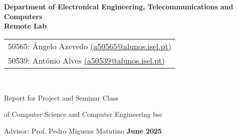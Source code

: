 \documentclass[a4paper,openright,twoside,11pt]{report}
\begin{document}
\thispagestyle{empty}

\begin{titlepage}
  \begin{center}
    \begin{minipage}[l]{\textwidth}
        \hspace{-15mm}\\
    \end{minipage}\\[10mm]
    {\large \textbf{Department of Electronical Engineering, Telecommunications and Computers}\\[1.5cm]}
    {\Huge \textbf{Remote Lab}\\[2cm]}    
    {\large \begin{tabular}{l}
      50565: Ângelo Azevedo \href{mailto:a50565@alunos.isel.pt}{(a50565@alunos.isel.pt)}\\
      50539: António Alves \href{mailto:a50539@alunos.isel.pt}{(a50539@alunos.isel.pt)}\\
    \end{tabular}\\[3cm] }
    {\large Report for Project and Seminar Class
    
    of Computer Science and Computer Engineering \acs{bsc}\\[3cm]}
    {\large Advisor: Prof. Pedro Miguens Matutino}   
    \vfill
    {\large \textbf{June 2025}}   
  \end{center}
\end{titlepage}

\baselineskip 18pt %

\newpage
\thispagestyle{empty}
\end{document}
